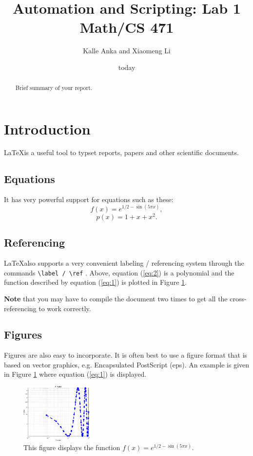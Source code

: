 \documentclass[12pt]{article}
\title{Automation and Scripting: Lab 1 Math/CS 471}
\author{Kalle Anka and Xiaomeng Li}
\date{today}   %
\begin{document}
\maketitle

\begin{abstract}
Brief summary of your report.
\end{abstract}
\section{Introduction}
\LaTeX is a useful tool to typset reports, papers and other
scientific documents. 

\subsection{Equations}
It has very powerful support for equations such
as these:
\begin{equation}
f(x) = e^{1/2 - \sin(5 \pi    x)}, \label{eq:1} 
\end{equation}
\begin{equation}
p(x) = 1+x+x^2. \label{eq:2} 
\end{equation}

\subsection{Referencing}
\LaTeX also supports a very convenient labeling / referencing system
through the commands \verb+\label / \ref+ . Above, equation
(\ref{eq:2}) is a polynomial and the function described by equation
(\ref{eq:1}) is plotted in Figure \ref{fig:1}. 

{\bf Note} that you may have to compile the document two times to get
all the cross-referencing to work correctly.

\subsection{Figures}
Figures are also easy to incorporate. It is often best to use a figure
format that is based on vector graphics, e.g. Encapsulated PostScript
(eps). An example is given in Figure \ref{fig:1} where equation
(\ref{eq:1}) is displayed.

\begin{figure}[htb]
\begin{center}
\includegraphics[width=0.32\textwidth]{lab1.eps}
\caption{This figure displays the function $f(x) = e^{1/2 - \sin(5 \pi
    x)}$. \label{fig:1}}
\end{center}
\end{figure}
\end{document}
